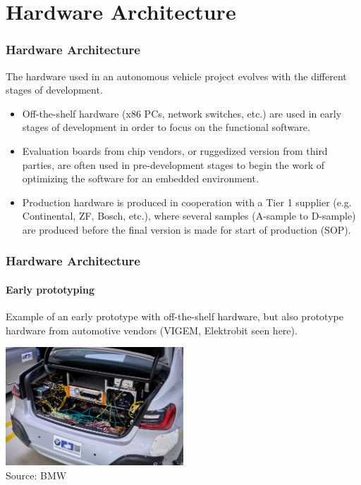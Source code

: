 \section{Hardware Architecture}

\begin{frame}
\frametitle{Hardware Architecture}
The hardware used in an autonomous vehicle project evolves with the different
stages of development.

\begin{itemize}
    \item Off-the-shelf hardware (x86 PCs, network switches, etc.) are used
        in early stages of development in order to focus on the functional
        software.
    \item Evaluation boards from chip vendors, or ruggedized version from
        third parties, are often used in pre-development stages to begin
        the work of optimizing the software for an embedded environment.
    \item Production hardware is produced in cooperation with a Tier 1
        supplier (e.g. Continental, ZF, Bosch, etc.), where several samples
        (A-sample to D-sample) are produced before the final version is made
        for start of production (SOP).
\end{itemize}
\end{frame}

\begin{frame}
\frametitle{Hardware Architecture}
\framesubtitle{Early prototyping}
Example of an early prototype with off-the-shelf hardware, but also prototype
hardware from automotive vendors (VIGEM, Elektrobit seen here).
\begin{center}
\includegraphics[width=0.5\textwidth]{images/bmw_vehicle_trunk.jpg}\\
\footnotesize Source: BMW\footnotemark[1]
\end{center}
\end{frame}

